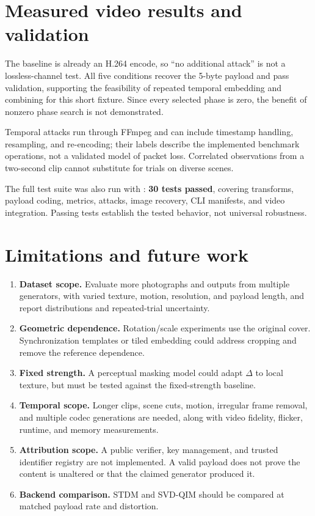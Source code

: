 \documentclass[11pt,a4paper]{article}
\newcommand{\code}[1]{\texttt{\detokenize{#1}}}
\begin{document}
\section{Measured video results and validation}
\begin{table}[H]\centering\footnotesize

\caption{Recovery from the 24-frame synthetic clip. Samples count low-pass score vectors. Every selected result used phase 0.}
\label{tab:video}
\end{table}
The baseline is already an H.264 encode, so ``no additional attack'' is not a
lossless-channel test. All five conditions recover the 5-byte payload and pass
validation, supporting the feasibility of repeated temporal embedding and combining
for this short fixture. Since every selected phase is zero, the benefit of nonzero
phase search is not demonstrated.

Temporal attacks run through FFmpeg and can include timestamp handling, resampling,
and re-encoding; their labels describe the implemented benchmark operations, not a
validated model of packet loss. Correlated observations from a two-second clip
cannot substitute for trials on diverse scenes.

The full test suite was also run with \code{ffmpeg-python==0.2.0}: \textbf{30 tests
passed}, covering transforms, payload coding, metrics, attacks, image recovery, CLI
manifests, and video integration. Passing tests establish the tested behavior, not
universal robustness.

\section{Limitations and future work}
\begin{enumerate}
\item \textbf{Dataset scope.} Evaluate more photographs and outputs from multiple generators,
with varied texture, motion, resolution, and payload length, and report
distributions and repeated-trial uncertainty.
\item \textbf{Geometric dependence.} Rotation/scale experiments use the original cover.
Synchronization templates or tiled embedding could address cropping and remove the
reference dependence.
\item \textbf{Fixed strength.} A perceptual masking model could adapt $\Delta$ to local
texture, but must be tested against the fixed-strength baseline.
\item \textbf{Temporal scope.} Longer clips, scene cuts, motion, irregular frame removal,
and multiple codec generations are needed, along with video fidelity, flicker,
runtime, and memory measurements.
\item \textbf{Attribution scope.} A public verifier, key management, and trusted identifier
registry are not implemented. A valid payload does not prove the content is
unaltered or that the claimed generator produced it.
\item \textbf{Backend comparison.} STDM and SVD-QIM should be compared at matched payload
rate and distortion.
\end{enumerate}
\end{document}
